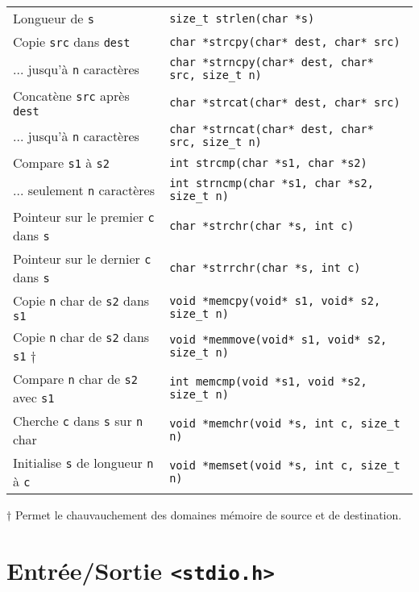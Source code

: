 \documentclass{article}
\newcommand{\cd}{\lstinline}
\begin{document}
\begin{multicols*}{3}
\begin{tabularx}{\linewidth}{Xl}
  Longueur de \texttt{s} & \cd{size_t strlen(char *s)} \\
  Copie \texttt{src} dans \texttt{dest} & \cd{char *strcpy(char* dest, char* src)} \\
   ... jusqu'à \texttt{n} caractères & \cd{char *strncpy(char* dest, char* src, size_t n)} \\
  Concatène \texttt{src} après \texttt{dest} & \cd{char *strcat(char* dest, char* src)} \\
   ... jusqu'à \texttt{n} caractères & \cd{char *strncat(char* dest, char* src, size_t n)} \\
  Compare \texttt{s1} à \texttt{s2} & \cd{int strcmp(char *s1, char *s2)} \\
   ... seulement \texttt{n} caractères & \cd{int strncmp(char *s1, char *s2, size_t n)} \\
  Pointeur sur le premier \texttt{c} dans \texttt{s} & \cd{char *strchr(char *s, int c)} \\
  Pointeur sur le dernier \texttt{c} dans \texttt{s} & \cd{char *strrchr(char *s, int c)} \\
  \hline
  Copie \texttt{n} char de \texttt{s2} dans \texttt{s1} & \cd{void *memcpy(void* s1, void* s2, size_t n)} \\
  Copie \texttt{n} char de \texttt{s2} dans \texttt{s1} $\dagger$ & \cd{void *memmove(void* s1, void* s2, size_t n)} \\
  Compare \texttt{n} char de \texttt{s2} avec \texttt{s1} & \cd{int memcmp(void *s1, void *s2, size_t n)} \\
  Cherche \texttt{c} dans \texttt{s} sur \texttt{n} char & \cd{void *memchr(void *s, int c, size_t n)} \\
  Initialise \texttt{s} de longueur \texttt{n} à \texttt{c} & \cd{void *memset(void *s, int c, size_t n)} \\
\end{tabularx}

$\dagger$ Permet le chauvauchement des domaines mémoire de source et de destination.

\section*{Entrée/Sortie \texttt{<stdio.h>}}

\begin{tabularx}{\linewidth}{
  >{\hsize=0.5\hsize}X%
  >{\hsize=1.5\hsize}X%
  >{\hsize=0.5\hsize}X%
  >{\hsize=1.5\hsize}X%
  }


\end{tabularx}
\end{multicols*}
\end{document}
